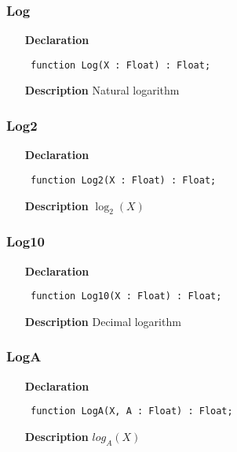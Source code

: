 \documentclass[12pt,a4paper,oneside]{report}
\newcommand{\declarationitem}[1]{\textbf{#1}}
\newcommand{\descriptiontitle}[1]{\textbf{#1}}
\newcommand{\code}[1]{\texttt{#1}}
\begin{document}
\subsubsection{Log}
\label{umath-Log}
\begin{itemize}\item[\declarationitem{Declaration}\hfill]
	\begin{flushleft}
		\code{
			function Log(X : Float) : Float;}
		
	\end{flushleft}
	
	\par
	\item[\descriptiontitle{Description}]
	Natural logarithm
	
\end{itemize}
\subsubsection{Log2}
\label{umath-Log2}
\begin{itemize}\item[\declarationitem{Declaration}\hfill]
	\begin{flushleft}
		\code{
			function Log2(X : Float) : Float;}
		
	\end{flushleft}
	
	\par
	\item[\descriptiontitle{Description}]
	$\log_2(X)$
	
\end{itemize}
\subsubsection{Log10}
\label{umath-Log10}
\begin{itemize}\item[\declarationitem{Declaration}\hfill]
	\begin{flushleft}
		\code{
			function Log10(X : Float) : Float;}
		
	\end{flushleft}
	
	\par
	\item[\descriptiontitle{Description}]
	Decimal logarithm
	
\end{itemize}
\subsubsection{LogA}
\label{umath-LogA}
\begin{itemize}\item[\declarationitem{Declaration}\hfill]
	\begin{flushleft}
		\code{
			function LogA(X, A : Float) : Float;}
		
	\end{flushleft}
	
	\par
	\item[\descriptiontitle{Description}]
	$log_A(X)$
	
\end{itemize}
\end{document}
